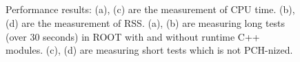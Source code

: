 \documentclass{webofc}
\begin{document}
\begin{figure}
\begin{minipage}{.48\textwidth}
 　 \end{minipage}
 　 
    \begin{minipage}{.48\textwidth}
 　 \end{minipage}\hfill
    \begin{minipage}{.48\textwidth}
 　 \end{minipage}
\caption{Performance results: (a), (c) are the measurement of CPU time. (b), (d) are the measurement of RSS. (a), (b) are measuring long tests (over 30 seconds) in ROOT with and without runtime C++ modules. (c), (d) are measuring short tests which is not PCH-nized.}
\label{fig:performance1}
\end{figure}
\end{document}
